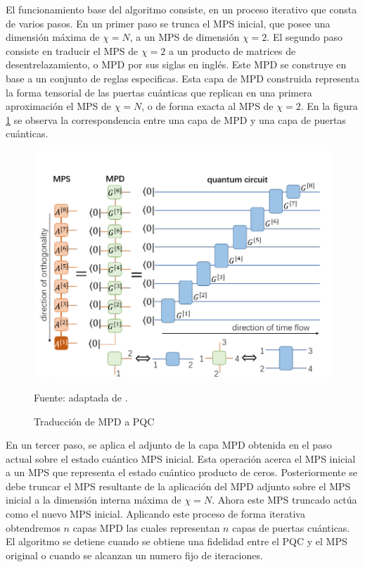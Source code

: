 \newpage

El funcionamiento base del algoritmo consiste, en un proceso iterativo que consta de varios pasos. En un primer paso se trunca el MPS inicial, que posee una dimensión máxima de $\chi = N$, a un MPS de dimensión $\chi = 2$. El segundo paso consiste en traducir el MPS de $\chi = 2$ a un producto de matrices de desentrelazamiento, o MPD por sus siglas en inglés. Este MPD se construye en base a un conjunto de reglas especificas. Esta capa de MPD construida representa la forma tensorial de las puertas cuánticas que replican en una primera aproximación el MPS de $\chi = N$, o de forma exacta al MPS de $\chi = 2$. En la figura \ref{fig:mpd_to_pqc} se observa la correspondencia entre una capa de MPD y una capa de puertas cuánticas.


\begin{figure}[!h]
    \centering
    \includegraphics[scale = 0.6]{img/05-mpd_to_quantum_circuit.png}
    \caption{Traducción de MPD a PQC}
    Fuente: adaptada de \citep{ran}.
    \label{fig:mpd_to_pqc}
\end{figure}

En un tercer paso, se aplica el adjunto de la capa MPD obtenida en el paso actual sobre el estado cuántico MPS inicial. Esta operación acerca el MPS inicial a un MPS que representa el estado cuántico producto de ceros. Posteriormente se debe truncar el MPS resultante de la aplicación del MPD adjunto sobre el MPS inicial a la dimensión interna máxima de $\chi=N$. Ahora este MPS truncado actúa como el nuevo MPS inicial. Aplicando este proceso de forma iterativa obtendremos $n$ capas MPD las cuales representan $n$ capas de puertas cuánticas. El algoritmo se detiene cuando se obtiene una fidelidad entre el PQC y el MPS original o cuando se alcanzan un numero fijo de iteraciones.

